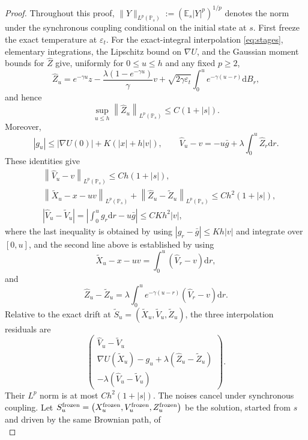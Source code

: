 \documentclass[11pt]{article}
\theoremstyle{definition}
\newcommand{\E}{\mathbb E}
\newcommand{\dd}{\mathrm d}
\newcommand{\eps}{\varepsilon}
\begin{document}
\begin{proof}
Throughout this proof,
$\|Y\|_{L^p(\mathbb P_s)}:=(\E_s|Y|^p)^{1/p}$ denotes the norm under the
synchronous coupling conditional on the initial state at $s$.
First freeze the exact temperature at $\eps_t$. For the exact-integral
interpolation \eqref{eq:stages}, elementary integrations, the Lipschitz bound
on $\nabla U$, and the Gaussian moment bounds for $\widehat Z$ give, uniformly
for $0\leq u\leq h$ and any fixed $p\geq2$,
\[
 \widehat Z_u=e^{-\gamma u}z
 -\frac{\lambda(1-e^{-\gamma u})}{\gamma}v
 +\sqrt{2\gamma\eps_t}\int_0^u e^{-\gamma(u-r)}\dd B_r,
\]
and hence
\[
\sup_{u\leq h}\left\|\widehat Z_u\right\|_{L^p(\mathbb P_s)}\leq C(1+|s|).
\]
Moreover,
\[
 |g_u|\leq |\nabla U(0)|+K(|x|+h|v|),\qquad
 \widehat V_u-v=-u\bar g+\lambda\int_0^u\widehat Z_r\dd r.
\]
These identities give
\begin{align*}
 &\left\|\widehat V_u-v\right\|_{L^p(\mathbb P_s)}\leq Ch(1+|s|),\\
 &\left\|\widetilde X_u-x-uv\right\|_{L^p(\mathbb P_s)}
 +\left\|\widehat Z_u-\widetilde Z_u\right\|_{L^p(\mathbb P_s)}
 \leq Ch^2(1+|s|),\\
 &\left|\widehat V_u-\widetilde V_u\right|
 =\left|\int_0^ug_r\dd r-u\bar g\right|\leq CKh^2|v|,
\end{align*}
where the last inequality is obtained by using
$|g_r-\bar g|\leq Kh|v|$ and integrate over $[0,u]$, 
and the second line above is established 
by using
\[
\widetilde X_u-x-uv=\int_0^u\left(\widehat V_r-v\right)\dd r, 
\]
and
\[
\widehat Z_u-\widetilde Z_u
=\lambda\int_0^u e^{-\gamma(u-r)}\left(\widehat V_r-v\right)\dd r.
\]
Relative to the exact drift at
$\widetilde S_u=\left(\widetilde X_u,\widetilde V_u,\widetilde Z_u\right)$, the three
interpolation residuals are
\begin{equation}\label{eq:residuals}
 \begin{pmatrix}
 \widehat V_u-\widetilde V_u\\
 \nabla U(\widetilde X_u)-g_u+\lambda(\widehat Z_u-\widetilde Z_u)\\
 -\lambda(\widehat V_u-\widetilde V_u)
 \end{pmatrix}.
\end{equation}
Their $L^p$ norm is at most $Ch^2(1+|s|)$. The noises cancel under synchronous
coupling. Let $S_u^{\rm frozen}=\left(X_u^{\rm frozen},V_u^{\rm frozen},
Z_u^{\rm frozen}\right)$ be the solution, started from $s$ and driven by the same
Brownian path, of
\begin{equation}\label{eq:frozenprocess}

\end{equation}
\end{proof}
\end{document}
